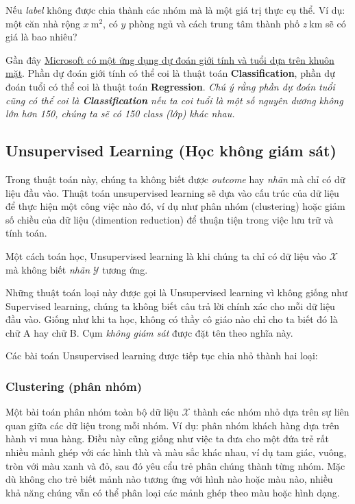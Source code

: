 Nếu \textit{label} không được chia thành các nhóm mà là một giá trị thực cụ thể. Ví dụ: một căn nhà rộng $x ~ \text{m}^2$, có $y$ phòng ngủ và cách trung tâm thành phố $z~ \text{km}$ sẽ có giá là bao nhiêu? 
  
Gần đây \href{http://how-old.net/}{Microsoft có một ứng dụng dự đoán giới tính và tuổi dựa trên khuôn mặt}. Phần dự đoán giới tính có thể coi là thuật toán \textbf{Classification}, phần dự đoán tuổi có thể coi là thuật toán \textbf{Regression}. \textit{Chú ý rằng phần dự đoán tuổi cũng có thể coi là \textbf{Classification} nếu ta coi tuổi là một số nguyên dương không lớn hơn 150, chúng ta sẽ có 150 class (lớp) khác nhau.} 
 
 
\subsection{Unsupervised Learning (Học không giám sát)}
Trong thuật toán này, chúng ta không biết được \textit{outcome} hay \textit{nhãn} mà chỉ có dữ liệu đầu vào. Thuật toán unsupervised learning sẽ dựa vào cấu trúc của dữ liệu để thực hiện một công việc nào đó, ví dụ như phân nhóm (clustering) hoặc giảm số chiều của dữ liệu (dimention reduction) để thuận tiện trong việc lưu trữ và tính toán. 
 
Một cách toán học, Unsupervised learning là khi chúng ta chỉ có dữ liệu vào $\mathcal{X} $ mà không biết \textit{nhãn} $\mathcal{Y}$ tương ứng.  
 
Những thuật toán loại này được gọi là Unsupervised learning vì không giống như Supervised learning, chúng ta không biết câu trả lời chính xác cho mỗi dữ liệu đầu vào. Giống như khi ta học, không có thầy cô giáo nào chỉ cho ta biết đó là chữ A hay chữ B. Cụm \textit{không giám sát} được đặt tên theo nghĩa này.  
 
Các bài toán Unsupervised learning được tiếp tục chia nhỏ thành hai loại:  
 
 
\subsubsection{Clustering (phân nhóm)}
Một bài toán phân nhóm toàn bộ dữ liệu $\mathcal{X}$ thành các nhóm nhỏ dựa trên sự liên quan giữa các dữ liệu trong mỗi nhóm. Ví dụ: phân nhóm khách hàng dựa trên hành vi mua hàng. Điều này cũng giống như việc ta đưa cho một đứa trẻ rất nhiều mảnh ghép với các hình thù và màu sắc khác nhau, ví dụ tam giác, vuông, tròn với màu xanh và đỏ, sau đó yêu cẩu trẻ phân chúng thành từng nhóm. Mặc dù không cho trẻ biết mảnh nào tương ứng với hình nào hoặc màu nào, nhiều khả năng chúng vẫn có thể phân loại các mảnh ghép theo màu hoặc hình dạng.  
 
